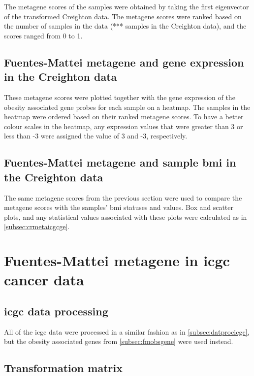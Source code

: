 The \gls{metagene} scores of the samples were obtained by taking the first eigenvector of the transformed Creighton data.
The \gls{metagene} scores were ranked based on the number of samples in the data (*** samples in the Creighton data), and the scores ranged from 0 to 1.

\subsection{Fuentes-Mattei metagene and gene expression in the Creighton data}
\label{subsec:fmmetage}

These \gls{metagene} scores were plotted together with the gene expression of the obesity associated gene probes for each sample on a heatmap.
The samples in the heatmap were ordered based on their ranked \gls{metagene} scores.
To have a better colour scales in the heatmap, any expression values that were greater than 3 or less than -3 were assigned the value of 3 and -3, respectively.

\subsection{Fuentes-Mattei metagene and sample \gls{bmi} in the Creighton data}
\label{subsec:fmmetabmi}

The same \gls{metagene} scores from the previous section were used to compare the \gls{metagene} scores with the samples' \gls{bmi} statuses and values.
Box and scatter plots, and any statistical values associated with these plots were calculated as in \cref{subsec:crmetaicgcge}.

\section{Fuentes-Mattei metagene in \gls{icgc} cancer data}
\label{sec:fmmetaicgc}

\subsection{\gls{icgc} data processing}
\label{subsec:datprocicgcfm}

All of the \gls{icgc} data were processed in a similar fashion as in \cref{subsec:datprocicgc}, but the obesity associated genes from \cref{subsec:fmobsgene} were used instead.

\subsection{Transformation matrix}
\label{subsec:icgctransmatfm}

